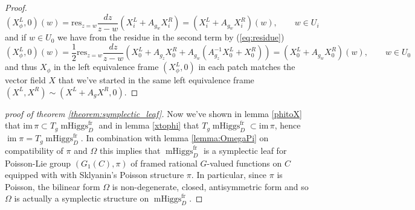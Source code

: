 \documentclass[11pt, oneside, reqno]{amsart}
\theoremstyle{definition} \newtheorem{definition}{Definition}[section]
\theoremstyle{definition} \newtheorem{remark}[definition]{Remark}
\theoremstyle{definition} \newtheorem{remarks}[definition]{Remarks}
\theoremstyle{definition} \newtheorem{question}[definition]{Question}
\theoremstyle{definition} \newtheorem*{note}{Note}
\theoremstyle{definition} \newtheorem{example}[definition]{Example}
\theoremstyle{definition} \newtheorem{examples}[definition]{Examples}
\DeclareMathOperator{\mhiggs}{mHiggs}
\DeclareMathOperator{\im}{im}
\newcommand{\fr}{\mathrm{fr}}
\begin{document}
\begin{proof}
  \begin{equation}
    (X^{L}_\phi, 0)(w) = \mathrm{res}_{z = w} \frac{dz}{ z - w} (X_{i}^{L} + A_{g_w} X_{i}^{R}) =
    (X_{i}^{L} + A_{g_w} X_{i}^{R})(w), \qquad w \in U_i
  \end{equation}
  and if $ w \in U_0$ we have from the residue in the second term by (\ref{eq:residue})
  \begin{equation}
    (X^{L}_\phi, 0)(w) = \frac 1 2 \mathrm{res}_{z = w} \frac{dz}{ z - w} (X_0^{L} + A_{g_z} X_0^{R} +  A_{g_{w}} ( A_{g_{z}}^{-1} X_0^{L} + X_0^{R} )) =
   ( X_{0}^{L} + A_{g_w} X_{0}^{R})(w), \qquad w \in U_0 
  \end{equation}
  and thus $X_\phi$ in the left equivalence
  frame $(X^{L}_{\phi}, 0)$ in each patch matches the vector field $X$ that we've started
  in the same left equivalence frame $(X^{L}, X^{R}) \sim (X^{L} + A_{g} X^{R}, 0 )$.
\end{proof}

\begin{proof}[proof of theorem \ref{theorem:symplectic_leaf}]
Now we've shown in lemma \ref{phitoX} that $\mathrm{im}\, \pi \subset T_{g} \mhiggs^{\fr}_{D}$
and in lemma \ref{xtophi} that $ T_{g} \mhiggs^{\fr}_{D} \subset \mathrm{im}\, \pi$,
hence $\im \pi =  T_{g} \mhiggs^{\fr}_{D}$. In combination with lemma \ref{lemma:OmegaPi}
on compatibility of $\pi$ and $\Omega$ this implies that $\mhiggs^{\fr}_{D}$ is
a symplectic leaf for Poisson-Lie group $(G_1(C), \pi)$ of framed rational $G$-valued functions
on $C$ equipped with  with Sklyanin's Poisson structure $\pi$. In particular,
since $\pi$ is Poisson, the bilinear form $\Omega$ is non-degenerate, closed, antisymmetric form
and so $\Omega$ is actually a  symplectic structure on $\mhiggs^{\fr}_{D}$. 
\end{proof}




\end{document}
